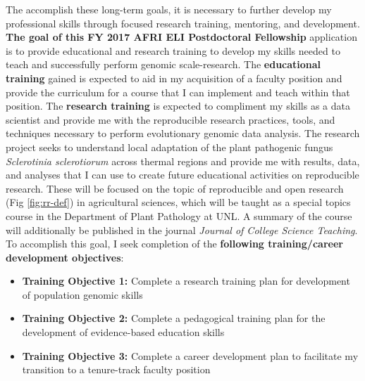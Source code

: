 \documentclass[12pt,letterpaper]{article}
\begin{document}
The accomplish these long-term goals, it is necessary to further develop my professional skills through focused research training, mentoring, and development. 
\textbf{The goal of this FY 2017 AFRI ELI Postdoctoral Fellowship} application is to provide educational and research training to develop my skills needed to teach and successfully perform genomic scale-research. 
The \textbf{educational training} gained is expected to aid in my acquisition of a faculty position and provide the curriculum for a course that I can implement and teach within that position. 
The \textbf{research training} is expected to compliment my skills as a data scientist and provide me with the reproducible research practices, tools, and techniques necessary to perform evolutionary genomic data analysis. 
The research project seeks to understand local adaptation of the plant pathogenic fungus \textit{Sclerotinia sclerotiorum} across thermal regions and provide me with results, data, and analyses that I can use to create future educational activities on reproducible research. 
These will be focused on the topic of reproducible and open research (Fig \ref{fig:rr-def}) in agricultural sciences, which will be taught as a special topics course in the Department of Plant Pathology at UNL. 
A summary of the course will additionally be published in the journal \textit{Journal of College Science Teaching}. 
To accomplish this goal, I seek completion of the \textbf{following training/career development objectives}:
\begin{itemize}
  \item \textbf{Training Objective 1:} Complete a research training plan for development of population genomic skills
  \item \textbf{Training Objective 2:} Complete a pedagogical training plan for the development of evidence-based education skills
  \item \textbf{Training Objective 3:} Complete a career development plan to facilitate my transition to a tenure-track faculty position
\end{itemize}


\end{document}
